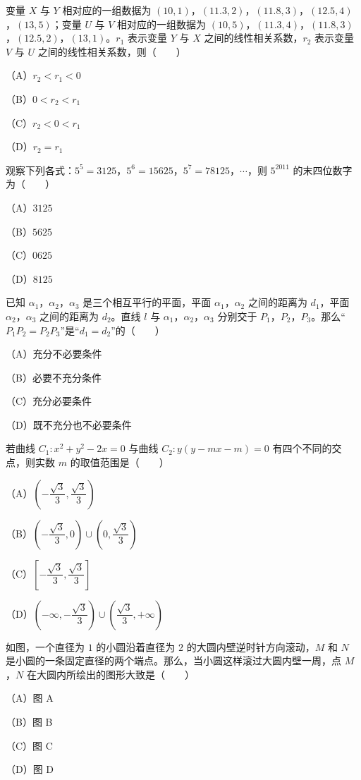 \begin{question}
变量 $X$ 与 $Y$ 相对应的一组数据为 $(10,1)$，$(11.3,2)$，$(11.8,3)$，$(12.5,4)$，$(13,5)$；变量 $U$ 与 $V$ 相对应的一组数据为 $(10,5)$，$(11.3,4)$，$(11.8,3)$，$(12.5,2)$，$(13,1)$。$r_1$ 表示变量 $Y$ 与 $X$ 之间的线性相关系数，$r_2$ 表示变量 $V$ 与 $U$ 之间的线性相关系数，则\mbox{（　　）}

（A）$r_2<r_1<0$

（B）$0<r_2<r_1$

（C）$r_2<0<r_1$

（D）$r_2=r_1$

\end{question}
\begin{question}
观察下列各式：$5^5=3125$，$5^6=15625$，$5^7=78125$，$\cdots$，则 $5^{2011}$ 的末四位数字为\mbox{（　　）}

（A）$3125$

（B）$5625$

（C）$0625$

（D）$8125$

\end{question}
\begin{question}
已知 $\alpha_1$，$\alpha_2$，$\alpha_3$ 是三个相互平行的平面，平面 $\alpha_1$，$\alpha_2$ 之间的距离为 $d_1$，平面 $\alpha_2$，$\alpha_3$ 之间的距离为 $d_2$。直线 $l$ 与 $\alpha_1$，$\alpha_2$，$\alpha_3$ 分别交于 $P_1$，$P_2$，$P_3$。那么“$P_1P_2=P_2P_3$”是“$d_1=d_2$”的\mbox{（　　）}

（A）充分不必要条件

（B）必要不充分条件

（C）充分必要条件

（D）既不充分也不必要条件

\end{question}
\begin{question}
若曲线 $C_1:x^2+y^2-2x=0$ 与曲线 $C_2:y(y-mx-m)=0$ 有四个不同的交点，则实数 $m$ 的取值范围是\mbox{（　　）}

（A）$\left(-\dfrac{\sqrt3}3,\dfrac{\sqrt3}3\right)$

（B）$\left(-\dfrac{\sqrt3}3,0\right)\cup\left(0,\dfrac{\sqrt3}3\right)$

（C）$\left[-\dfrac{\sqrt3}3,\dfrac{\sqrt3}3\right]$

（D）$\left(-\infty,-\dfrac{\sqrt3}3\right)\cup\left(\dfrac{\sqrt3}3,+\infty\right)$

\Needspace{0.4\textheight}
\end{question}
\begin{question}
如图，一个直径为 $1$ 的小圆沿着直径为 $2$ 的大圆内壁逆时针方向滚动，$M$ 和 $N$ 是小圆的一条固定直径的两个端点。那么，当小圆这样滚过大圆内壁一周，点 $M$，$N$ 在大圆内所绘出的图形大致是\mbox{（　　）}

（A）图 A

（B）图 B

（C）图 C

（D）图 D
\nopagebreak[4]
\begin{center}\end{center}
\nopagebreak[4]
\end{question}

